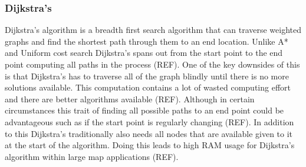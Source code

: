 \subsubsection{Dijkstra's}
Dijkstra’s algorithm is a breadth first search algorithm that can traverse weighted graphs and find the shortest path through them to an end location. Unlike A* and Uniform cost search Dijkstra’s spans out from the start point to the end point computing all paths in the process (REF). One of the key downsides of this is that Dijkstra’s has to traverse all of the graph blindly until there is no more solutions available. This computation contains a lot of wasted computing effort and there are better algorithms available (REF). Although in certain circumstances this trait of finding all possible paths to an end point could be advantageous such as if the start point is regularly changing (REF).
In addition to this Dijkstra’s traditionally also needs all nodes that are available given to it at the start of the algorithm. Doing this leads to high RAM usage for Dijkstra’s algorithm within large map applications (REF). 
